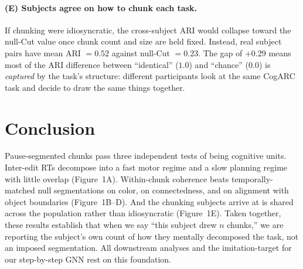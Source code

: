 \documentclass[11pt]{article}
\begin{document}
\paragraph{(E) Subjects agree on how to chunk each task.} If chunking
were idiosyncratic, the cross-subject ARI would collapse toward the
null-Cut value once chunk count and size are held fixed. Instead, real
subject pairs have mean ARI $= 0.52$ against null-Cut $= 0.23$. The
gap of $+0.29$ means most of the ARI difference between ``identical''
($1.0$) and ``chance'' ($0.0$) is \emph{captured} by the task's
structure: different participants look at the same CogARC task and
decide to draw the same things together.

\section*{Conclusion}

Pause-segmented chunks pass three independent tests of being cognitive
units. Inter-edit RTs decompose into a fast motor regime and a slow
planning regime with little overlap (Figure~1A). Within-chunk
coherence beats temporally-matched null segmentations on color, on
connectedness, and on alignment with object boundaries
(Figure~1B--D). And the chunking subjects arrive at is shared across
the population rather than idiosyncratic (Figure~1E). Taken together,
these results establish that when we say ``this subject drew $n$
chunks,'' we are reporting the subject's own count of how they
mentally decomposed the task, not an imposed segmentation. All
downstream analyses and the imitation-target for our step-by-step GNN
rest on this foundation.
\end{document}
